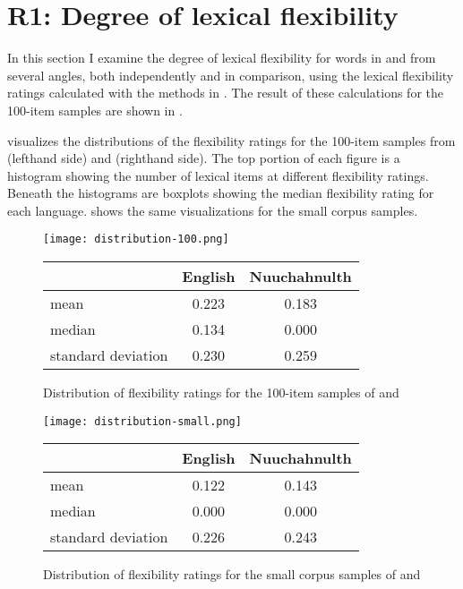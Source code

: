 \section{R1: Degree of lexical flexibility}
\label{sec:4.3}

In this section I examine the degree of lexical flexibility for words in  and  from several angles, both independently and in comparison, using the lexical flexibility ratings calculated with the methods in . The result of these calculations for the 100-item samples are shown in .

 visualizes the distributions of the flexibility ratings for the 100-item samples from  (lefthand side) and  (righthand side). The top portion of each figure is a histogram showing the number of lexical items at different flexibility ratings. Beneath the histograms are boxplots showing the median flexibility rating for each language.  shows the same visualizations for the small corpus samples.

\begin{figure}

  \centering
  \caption{Distribution of flexibility ratings for the 100-item samples of  and }
  \label{fig:histogram-100-items}

  \texttt{[image: distribution-100.png]}

  \begin{tabular}{ l c c }
    \toprule
    { }                & English & Nuuchahnulth\\
    \midrule
    mean               & 0.223   & 0.183       \\
    median             & 0.134   & 0.000       \\
    standard deviation & 0.230   & 0.259       \\
    \bottomrule
  \end{tabular}

\end{figure}

\begin{figure}

  \centering
  \caption{Distribution of flexibility ratings for the small corpus samples of  and }
  \label{fig:histogram-small-corpus}

  \texttt{[image: distribution-small.png]}

  \begin{tabular}{ l c c }
    \toprule
    { }                & English & Nuuchahnulth\\
    \midrule
    mean               & 0.122   & 0.143       \\
    median             & 0.000   & 0.000       \\
    standard deviation & 0.226   & 0.243       \\
    \bottomrule
  \end{tabular}

\end{figure}

